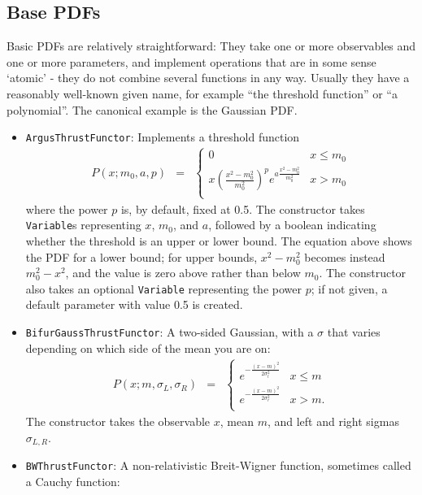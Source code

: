 \documentclass[12pt,pdflatex]{article}
\begin{document}
\subsection{Base PDFs}

Basic PDFs are relatively straightforward: They take one or more observables
and one or more parameters, and implement operations that are in some sense
`atomic' - they do not combine several functions in any way. Usually they have
a reasonably well-known given name, for example ``the threshold function'' or ``a polynomial''. 
The canonical example is the Gaussian PDF. 

\begin{itemize}
\item \texttt{ArgusThrustFunctor}: Implements a threshold function
\begin{eqnarray}
P(x;m_0,a,p) &=& \left\{ \begin{matrix}
0 & x \le m_0 \\
x\left(\frac{x^2-m_0^2}{m_0^2}\right)^p e^{a\frac{x^2-m_0^2}{m_0^2}} & x > m_0 \\
\end{matrix}
\right. 
\end{eqnarray}
where the power $p$ is, by default, fixed at 0.5. The constructor takes \texttt{Variable}s
representing $x$, $m_0$,
and $a$, followed by a boolean indicating whether the threshold is an upper or lower
bound. The equation above shows the PDF for a lower bound; for upper bounds, $x^2-m_0^2$
becomes instead $m_0^2-x^2$, and the value is zero above rather than below $m_0$. 
The constructor also takes an optional \texttt{Variable} representing the power $p$;
if not given, a default parameter with value 0.5 is created. 
\item \texttt{BifurGaussThrustFunctor}: A two-sided Gaussian, with a $\sigma$ that
varies depending on which side of the mean you are on: 
\begin{eqnarray}
P(x;m,\sigma_L,\sigma_R) &=& \left\{ \begin{matrix}
e^{-\frac{(x-m)^2}{2\sigma_l^2}} & x \le m \\
e^{-\frac{(x-m)^2}{2\sigma_r^2}} & x > m. \\
\end{matrix}
\right. 
\end{eqnarray}
The constructor takes the observable $x$, mean $m$, and left and right sigmas
$\sigma_{L,R}$.
\item \texttt{BWThrustFunctor}: A non-relativistic Breit-Wigner function,
sometimes called a Cauchy function:

\end{itemize}
\end{document}
